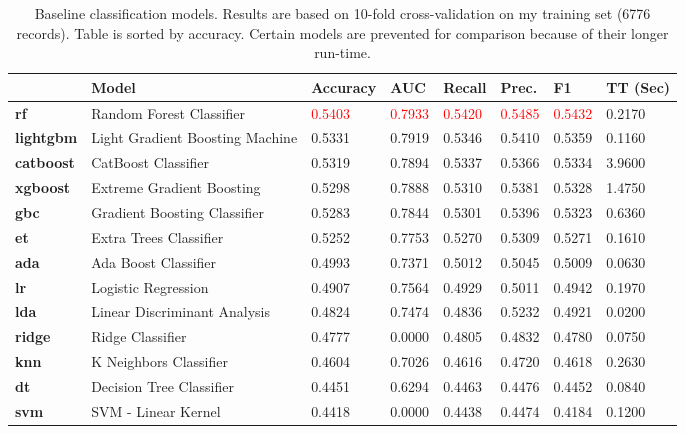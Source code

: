 \documentclass[11pt]{article}
\begin{document}
\begin{table}[h]
\begin{center}
    \begin{tabular}{llllllll}
    \toprule
    \textbf{} &
      \textbf{Model} &
      \textbf{Accuracy} &
      \textbf{AUC} &
      \textbf{Recall} &
      \textbf{Prec.} &
      \textbf{F1} &
      \textbf{TT (Sec)} \\
\midrule
    \textbf{rf} &
{Random Forest Classifier} &
\textcolor{red}{0.5403} & \textcolor{red}{0.7933} & \textcolor{red}{0.5420} & \textcolor{red}{0.5485} & \textcolor{red}{0.5432} & {0.2170} \\
\textbf{lightgbm} &
  Light Gradient Boosting Machine &
       {0.5331} & {0.7919} & {0.5346} & {0.5410} & {0.5359} & 0.1160 \\
{\textbf{catboost}} &
  {CatBoost Classifier} & {0.5319} & {0.7894} & {0.5337} & {0.5366} & {0.5334} & {3.9600} \\
{\textbf{xgboost}} &
  {Extreme Gradient Boosting} &
  {0.5298} & {0.7888} & {0.5310} & {0.5381} & {0.5328} & {1.4750} \\
{\textbf{gbc}} &
  {Gradient Boosting Classifier} & 
  {0.5283} & {0.7844} & {0.5301} & {0.5396} & {0.5323} & {0.6360} \\
{\textbf{et}} &
  {Extra Trees Classifier} &
  {0.5252} & {0.7753} & {0.5270} & {0.5309} & {0.5271} & {0.1610} \\
{\textbf{ada}} &
  {Ada Boost Classifier} &
  {0.4993} & {0.7371} & {0.5012} & {0.5045} & {0.5009} & {0.0630} \\
{\textbf{lr}} &
  {Logistic Regression} &
  {0.4907} & {0.7564} & {0.4929} & {0.5011} & {0.4942} & {0.1970} \\
{\textbf{lda}} &
  {Linear Discriminant Analysis} &
  {0.4824} & {0.7474} & {0.4836} & {0.5232} & {0.4921} & {0.0200} \\
{\textbf{ridge}} &
  {Ridge Classifier} &
  {0.4777} & {0.0000} & {0.4805} & {0.4832} & {0.4780} & {0.0750} \\
{\textbf{knn}} &
  {K Neighbors Classifier} &
  {0.4604} & {0.7026} & {0.4616} & {0.4720} & {0.4618} & {0.2630} \\
{\textbf{dt}} &
  {Decision Tree Classifier} &
  {0.4451} & {0.6294} & {0.4463} & {0.4476} & {0.4452} & {0.0840} \\
{\textbf{svm}} &
  {SVM - Linear Kernel} &
  {0.4418} & {0.0000} & {0.4438} & {0.4474} & {0.4184} & {0.1200} \\
  \bottomrule
\end{tabular}
\end{center}
\caption{ Baseline classification models. Results are based on 10-fold cross-validation on my training set (6776 records). Table is sorted by accuracy. Certain models are prevented for comparison because of their longer run-time.}
\label{table:baseline}
\end{table}
\end{document}

